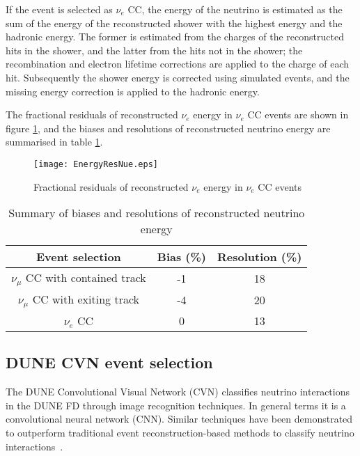If the event is selected as $\nu_{e}$ CC, the energy of the 
neutrino is estimated as the sum of the energy of the reconstructed shower with the highest energy and the hadronic energy. The former is estimated from the charges of the reconstructed 
hits in the shower, and the latter from the hits not in the shower; the recombination and electron lifetime corrections are applied to the charge of each hit. Subsequently the shower 
energy is corrected using simulated events, and the missing energy correction is applied to the hadronic energy.

The fractional residuals of reconstructed $\nu_{e}$ energy in $\nu_{e}$ CC events are shown in figure \ref{fig:enresnue}, and the biases and resolutions of reconstructed neutrino energy 
are summarised in table \ref{tab:ressummary}.

\begin{figure}[h]
    \centering
        \texttt{[image: EnergyResNue.eps]}
        \caption{Fractional residuals of reconstructed $\nu_{e}$ energy in $\nu_{e}$ CC events}
        \label{fig:enresnue}
\end{figure}

\begin{table}[h]
\begin{center}
\begin{tabular}{|c|c|c|}
\hline  
 Event selection  &   Bias (\%) & Resolution (\%) \\ \hline
\hline
 $\nu_{\mu}$ CC with contained track  &   -1  &  18   \\ \hline
 $\nu_{\mu}$ CC with exiting track  &  -4   &  20 \\ \hline
 $\nu_{e}$ CC    &  0 & 13    \\ \hline
\end{tabular}
\caption{Summary of biases and resolutions of reconstructed neutrino energy}
\label{tab:ressummary}
\end{center}
\end{table}


\subsection{DUNE CVN event selection}
The DUNE Convolutional Visual Network (CVN) classifies neutrino interactions in the DUNE FD through image recognition techniques. In general terms it is a convolutional neural network (CNN). Similar techniques have been demonstrated to outperform traditional event reconstruction-based methods to classify neutrino interactions~\cite{novacvn}.

